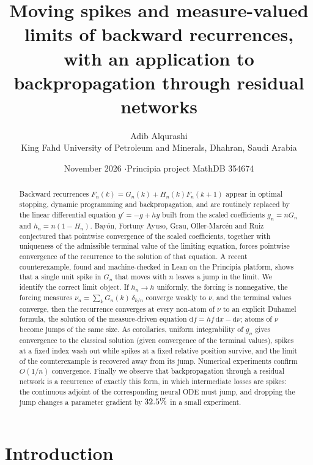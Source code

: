 \documentclass[11pt]{article}
\title{\textbf{Moving spikes and measure-valued limits of backward recurrences},\\[2pt]
\large with an application to backpropagation through residual networks}
\author{Adib Alqurashi\\[2pt]
\small King Fahd University of Petroleum and Minerals, Dhahran, Saudi Arabia}
\date{\small November 2026 \quad$\cdot$\quad Principia project MathDB 354674}
\theoremstyle{definition}
\theoremstyle{remark}
\newcommand{\dd}{\,\mathrm{d}}
\newcommand{\1}{\mathbf{1}}
\begin{document}
\maketitle

\begin{abstract}
Backward recurrences $F_n(k)=G_n(k)+H_n(k)F_n(k+1)$ appear in optimal stopping, dynamic
programming and backpropagation, and are routinely replaced by the linear differential
equation $y'=-g+hy$ built from the scaled coefficients $g_n=nG_n$ and $h_n=n(1-H_n)$.
Bay\'on, Fortuny Ayuso, Grau, Oller-Marc\'en and Ruiz conjectured that pointwise convergence
of the scaled coefficients, together with uniqueness of the admissible terminal value of the
limiting equation, forces pointwise convergence of the recurrence to the solution of that
equation. A recent counterexample, found and machine-checked in Lean on the Principia platform,
shows that a single unit spike in $G_n$ that moves with $n$ leaves a jump in the limit.
We identify the correct limit object. If $h_n\to h$ uniformly, the forcing is nonnegative,
the forcing measures $\nu_n=\sum_k G_n(k)\,\delta_{k/n}$ converge weakly to $\nu$, and the terminal
values converge, then the recurrence converges at every non-atom of $\nu$ to an explicit Duhamel
formula, the solution of the measure-driven equation $\mathrm{d}f=hf\dd x-\mathrm{d}\nu$; atoms of
$\nu$ become jumps of the same size. As corollaries, uniform integrability of $g_n$ gives
convergence to the classical solution (given convergence of the terminal values), spikes at a
fixed index wash out while spikes at a fixed relative position survive, and the limit of the
counterexample is recovered away from its jump. Numerical experiments confirm $O(1/n)$ convergence. Finally we observe
that backpropagation through a residual network is a recurrence of exactly this form, in which
intermediate losses are spikes: the continuous adjoint of the corresponding neural ODE must
jump, and dropping the jump changes a parameter gradient by $32.5\%$ in a small experiment.
\end{abstract}

\tableofcontents
\bigskip

\section{Introduction}\label{sec:intro}
\end{document}
